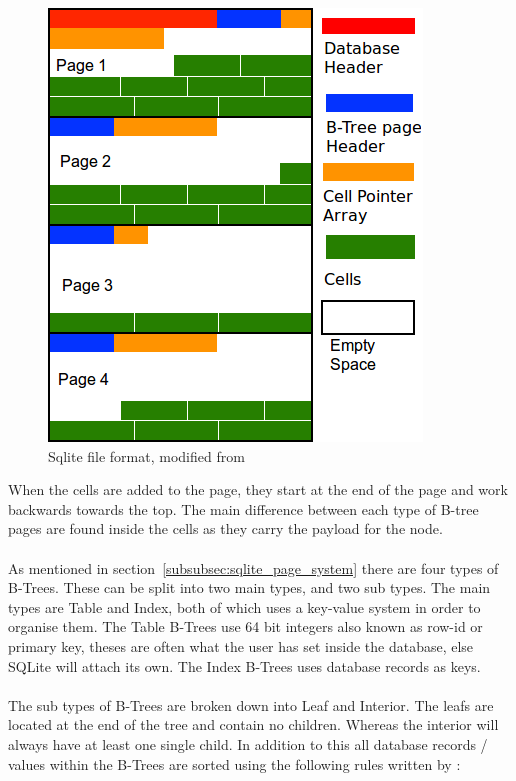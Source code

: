 \begin{figure}[H]
	\centering
	\includegraphics[scale=0.5]{images/sqlite_file_format.png}
	\caption{Sqlite file format, modified from \cite{sausagefactory}}
	\label{fig:sqlite_file_format}
\end{figure}

When the cells are added to the page, they start at the end of the page and work backwards towards the top. The main difference between each type of B-tree pages are found inside the cells as they carry the payload for the node. 
\\\\
As mentioned in section~\ref{subsubsec:sqlite_page_system} there are four types of B-Trees. These can be split into two main types, and two sub types. The main types are Table and Index, both of which uses a key-value system in order to organise them. The Table B-Trees use 64 bit integers also known as row-id or primary key, theses are often what the user has set inside the database, else SQLite will attach its own. The Index B-Trees uses database records as keys. 
\\\\
The sub types of B-Trees are broken down into Leaf and Interior. The leafs are located at the end of the tree and contain no children. Whereas the interior will always have at least one single child. In addition to this all database records / values within the B-Trees are sorted using the following rules written by \cite{sqliteray}:

